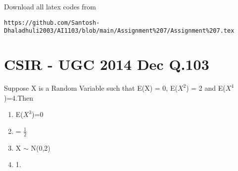 \documentclass[journal,12pt,twocolumn]{IEEEtran}
\begin{document}
Download all latex codes from 
\begin{lstlisting}
https://github.com/Santosh-Dhaladhuli2003/AI1103/blob/main/Assignment%207/Assignment%207.tex
\end{lstlisting}
\section{\textbf{CSIR - UGC 2014 Dec Q.103}}
Suppose X is a Random Variable such that E(X) = 0, E($X^2$) = 2 and E($X^4$)=4.Then

\begin{enumerate}
\item  E($X^3$)=0
\item {}= $\frac{1}{2}$
\item X $\sim$ N(0,2) 
\item {} 1.
\end{enumerate}
\end{document}
